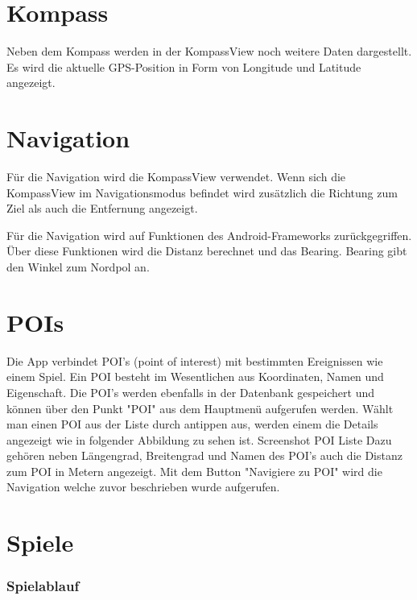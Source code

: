 \section{Kompass}
Neben dem Kompass werden in der KompassView noch weitere Daten dargestellt. Es wird die aktuelle GPS-Position in Form von Longitude und Latitude angezeigt.


\section{Navigation}
Für die Navigation wird die KompassView verwendet. Wenn sich die KompassView im Navigationsmodus befindet wird zusätzlich die Richtung zum Ziel als auch die Entfernung angezeigt.


Für die Navigation wird auf Funktionen des Android-Frameworks zurückgegriffen. Über diese Funktionen wird die Distanz berechnet und das Bearing. Bearing gibt den Winkel zum Nordpol an.

\section{POIs}
Die App verbindet POI's (point of interest)  mit bestimmten Ereignissen wie einem Spiel. Ein POI besteht im Wesentlichen aus Koordinaten, Namen und Eigenschaft.  Die POI's werden ebenfalls in der Datenbank gespeichert und können über den Punkt "POI" aus dem Hauptmenü aufgerufen werden. Wählt man einen POI aus der Liste durch antippen aus, werden einem die Details angezeigt wie in folgender Abbildung zu sehen ist.
\TODO Screenshot POI Liste
Dazu gehören neben Längengrad, Breitengrad und Namen des POI's auch die Distanz zum POI in Metern angezeigt. Mit dem Button "Navigiere zu POI" wird die Navigation welche zuvor beschrieben wurde aufgerufen.

\section{Spiele}




\subsubsection{Spielablauf}

